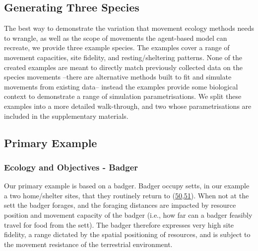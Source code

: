 \documentclass[10pt,a4paper]{article}
\begin{document}
\hypertarget{generating-three-species}{%
\subsection{Generating Three Species}\label{generating-three-species}}

The best way to demonstrate the variation that movement ecology methods needs to wrangle, as well as the scope of movements the agent-based model can recreate, we provide three example species.
The examples cover a range of movement capacities, site fidelity, and resting/sheltering patterns.
None of the created examples are meant to directly match previously collected data on the species movements --there are alternative methods built to fit and simulate movements from existing data-- instead the examples provide some biological context to demonstrate a range of simulation parametrisations.
We split these examples into a more detailed walk-through, and two whose parametrisations are included in the supplementary materials.

\hypertarget{primary-example}{%
\subsection{Primary Example}\label{primary-example}}

\hypertarget{ecology-and-objectives---badger}{%
\subsubsection{Ecology and Objectives - Badger}\label{ecology-and-objectives---badger}}

Our primary example is based on a badger.
Badger occupy setts, in our example a two home/shelter sites, that they routinely return to (\protect\hyperlink{ref-kowalczyk_daily_2006}{50},\protect\hyperlink{ref-feore_habitat_1999}{51}).
When not at the sett the badger forages, and the foraging distances are impacted by resource position and movement capacity of the badger (i.e., how far can a badger feasibly travel for food from the sett).
The badger therefore expresses very high site fidelity, a range dictated by the spatial positioning of resources, and is subject to the movement resistance of the terrestrial environment.
\end{document}
